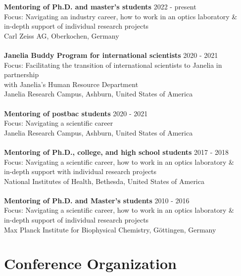\documentclass[margin,line]{res}
\begin{document}
\begin{resume}
{\bf Mentoring of Ph.D. and master's students} \hfill 2022 - present\\
Focus: Navigating an industry career, how to work in an optics laboratory \&\\
in-depth support of individual research projects\\
Carl Zeiss AG, Oberkochen, Germany\\
\vspace*{-3mm}\\
{\bf  Janelia Buddy Program for international scientists} \hfill 2020 - 2021\\
Focus: Facilitating the transition of international scientists to Janelia in partnership \\
with Janelia's Human Resource Department\\
Janelia Research Campus, Ashburn, United States of America\\
\vspace*{-3mm}\\
{\bf  Mentoring of postbac students} \hfill 2020 - 2021\\
Focus: Navigating a scientific career\\
Janelia Research Campus, Ashburn, United States of America\\
\vspace*{-3mm}\\
{\bf  Mentoring of Ph.D., college, and high school students}  \hfill 2017 - 2018\\
Focus: Navigating a scientific career, how to work in an optics laboratory \&\\
in-depth support with individual research projects\\
National Institutes of Health, Bethesda, United States of America\\
\vspace*{-3mm}\\
{\bf Mentoring of Ph.D. and Master's students}  \hfill {2010 - 2016}\\
Focus: Navigating a scientific career, how to work in an optics laboratory \&\\
in-depth support of individual research projects\\
Max Planck Institute for Biophysical Chemistry, Göttingen, Germany \\


\section{\sc Conference Organization}


\end{resume}
\end{document}
